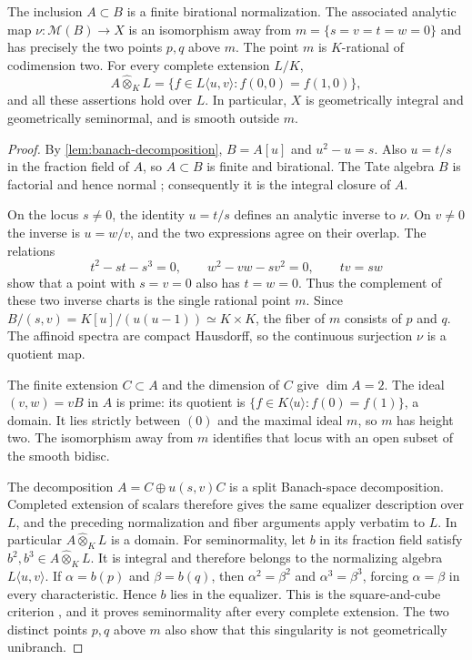 \documentclass[11pt,a4paper]{amsart}
\begin{document}
\begin{proposition}\label{prop:normalization-base-change}
The inclusion $A\subset B$ is a finite birational normalization. The associated analytic map $\nu:\mathcal M(B)\to X$ is an isomorphism away from $m=\{s=v=t=w=0\}$ and has precisely the two points $p,q$ above $m$. The point $m$ is $K$-rational of codimension two. For every complete extension $L/K$,
\[
 A\widehat\otimes_K L=\{f\in L\langle u,v\rangle:f(0,0)=f(1,0)\},
\]
and all these assertions hold over $L$. In particular, $X$ is geometrically integral and geometrically seminormal, and is smooth outside $m$.
\end{proposition}

\begin{proof}
By \cref{lem:banach-decomposition}, $B=A[u]$ and $u^2-u=s$. Also $u=t/s$ in the fraction field of $A$, so $A\subset B$ is finite and birational. The Tate algebra $B$ is factorial and hence normal \cite[Theorem~5.4]{JonssonHorawa20}; consequently it is the integral closure of $A$.

On the locus $s\neq0$, the identity $u=t/s$ defines an analytic inverse to $\nu$. On $v\neq0$ the inverse is $u=w/v$, and the two expressions agree on their overlap. The relations
\[
 t^2-st-s^3=0,\qquad w^2-vw-sv^2=0,\qquad tv=sw
\]
show that a point with $s=v=0$ also has $t=w=0$. Thus the complement of these two inverse charts is the single rational point $m$. Since $B/(s,v)=K[u]/(u(u-1))\simeq K\times K$, the fiber of $m$ consists of $p$ and $q$. The affinoid spectra are compact Hausdorff, so the continuous surjection $\nu$ is a quotient map.

The finite extension $C\subset A$ and the dimension of $C$ give $\dim A=2$. The ideal $(v,w)=vB$ in $A$ is prime: its quotient is $\{f\in K\langle u\rangle:f(0)=f(1)\}$, a domain. It lies strictly between $(0)$ and the maximal ideal $m$, so $m$ has height two. The isomorphism away from $m$ identifies that locus with an open subset of the smooth bidisc.

The decomposition $A=C\oplus u(s,v)C$ is a split Banach-space decomposition. Completed extension of scalars therefore gives the same equalizer description over $L$, and the preceding normalization and fiber arguments apply verbatim to $L$. In particular $A\widehat\otimes_K L$ is a domain. For seminormality, let $b$ in its fraction field satisfy $b^2,b^3\in A\widehat\otimes_K L$. It is integral and therefore belongs to the normalizing algebra $L\langle u,v\rangle$. If $\alpha=b(p)$ and $\beta=b(q)$, then $\alpha^2=\beta^2$ and $\alpha^3=\beta^3$, forcing $\alpha=\beta$ in every characteristic. Hence $b$ lies in the equalizer. This is the square-and-cube criterion \cite[Definition~29.48.1, \href{https://stacks.math.columbia.edu/tag/0EUL}{Tag~0EUL}]{Stacks}, and it proves seminormality after every complete extension. The two distinct points $p,q$ above $m$ also show that this singularity is not geometrically unibranch.
\end{proof}
\end{document}
